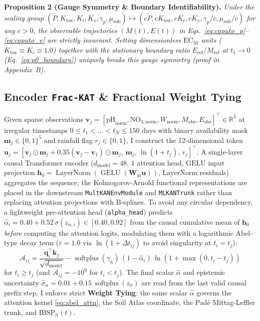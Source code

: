 \documentclass[10pt,twocolumn,a4paper]{article}
\begin{document}
\noindent\textbf{Proposition 2 (Gauge Symmetry \& Boundary Identifiability).} \emph{Under the scaling group $(\tilde{P}, K_{\text{tox}}, K_i, K_s, \gamma_p, \mu_{\text{sub}}) \mapsto (c\tilde{P}, cK_{\text{tox}}, cK_i, cK_s, \gamma_p/c, \mu_{\text{sub}}/c)$ for any $c > 0$, the observable trajectories $(M(t), E(t))$ in Eqs.~\eqref{eq:caputo_p}--\eqref{eq:caputo_e} are strictly invariant. Setting dimensionless $\text{EC}_{50}$ units ($K_{\text{tox}} \equiv K_i \equiv 1.0$) together with the stationary boundary ratio $E_{\text{ref}}/M_{\text{ref}}$ at $t_1 \to 0$ (Eq.~\eqref{eq:p0_boundary}) uniquely breaks this gauge symmetry (proof in Appendix~B).}

\subsection{Encoder \texttt{Frac-KAT} \& Fractional Weight Tying}

Given sparse observations $\mathbf{v}_j = [\text{pH}_{\text{norm}}, \text{NO}_{3,\text{norm}}, W_{\text{norm}}, M_{\text{obs}}, E_{\text{obs}}]^\top \in \mathbb{R}^5$ at irregular timestamps $0 \le t_1 < \dots < t_N \le 150\text{ days}$ with binary availability mask $\mathbf{m}_j \in \{0,1\}^5$ and rainfall flag $r_j \in \{0,1\}$, I construct the 12-dimensional token $\mathbf{u}_j = [\mathbf{v}_j\odot\mathbf{m}_j + 0.35(\mathbf{v}_j - \mathbf{v}_1)\odot\mathbf{m}_j,\, \mathbf{m}_j,\, \ln(1+t_j),\, r_j]^\top$. A single-layer causal Transformer encoder ($d_{\text{model}} = 48$, $1$ attention head, $\text{GELU}$ input projection $\mathbf{h}_0 = \operatorname{LayerNorm}(\operatorname{GELU}(\mathbf{W}_{\text{in}}\mathbf{u}))$, $\text{LayerNorm}$ residuals) aggregates the sequence; the Kolmogorov-Arnold functional representations are placed in the downstream \texttt{MultKANEnvModule} and \texttt{MLKANTrunk} rather than replacing attention projections with B-splines. To avoid any circular dependency, a lightweight pre-attention head (\texttt{alpha\_head}) predicts $\hat{\alpha}_i = 0.40 + 0.52\,\sigma(z_{\alpha,i}) \in [0.40, 0.92]$ from the causal cumulative mean of $\mathbf{h}_0$ \emph{before} computing the attention logits, modulating them with a logarithmic Abel-type decay term ($\varepsilon = 1.0$ via $\ln(1 + \Delta t_{ij})$ to avoid singularity at $t_i = t_j$):
\begin{equation}
  \mathcal{A}_{ij} = \frac{\mathbf{q}_i^\top \mathbf{k}_j}{\sqrt{d_{\text{model}}}} - \operatorname{softplus}(\gamma_h)\,(1 - \hat{\alpha}_i)\,\ln\!\left(1 + \max(0, t_i - t_j)\right) \label{eq:abel_attn}
\end{equation}
for $t_i \ge t_j$ (and $\mathcal{A}_{ij} = -10^9$ for $t_i < t_j$). The final scalar $\hat{\alpha}$ and epistemic uncertainty $\hat{\sigma}_\alpha = 0.01 + 0.15\,\operatorname{softplus}(z_\sigma)$ are read from the last valid causal prefix step. I enforce strict \textbf{Weight Tying}: the same scalar $\hat{\alpha}$ governs the attention kernel \eqref{eq:abel_attn}, the Soil Atlas coordinate, the Pad\'e Mittag-Leffler trunk, and $\text{IBSP}_{\hat{\alpha}}(t)$.
\end{document}
